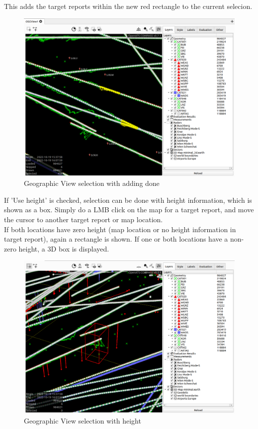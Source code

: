 This adds the target reports within the new red rectangle to the current selecion.

\begin{figure}[H]
    \hspace*{-2.5cm}
    \includegraphics[width=19cm,frame]{figures/geoview_select_add2.png}
  \caption{Geographic View selection with adding done}
\end{figure}

If 'Use height' is checked, selection can be done with height information, which is shown as a box. Simply do a LMB click on the map for a target report, and move the cursor to another target report or map location.  \\

If both locations have zero height (map location or no height information in target report), again a rectangle is shown. If one or both locations have a non-zero height, a 3D box is displayed.

\begin{figure}[H]
    \hspace*{-2.5cm}
    \includegraphics[width=19cm,frame]{figures/geoview_select3d.png}
  \caption{Geographic View selection with height}
\end{figure}


